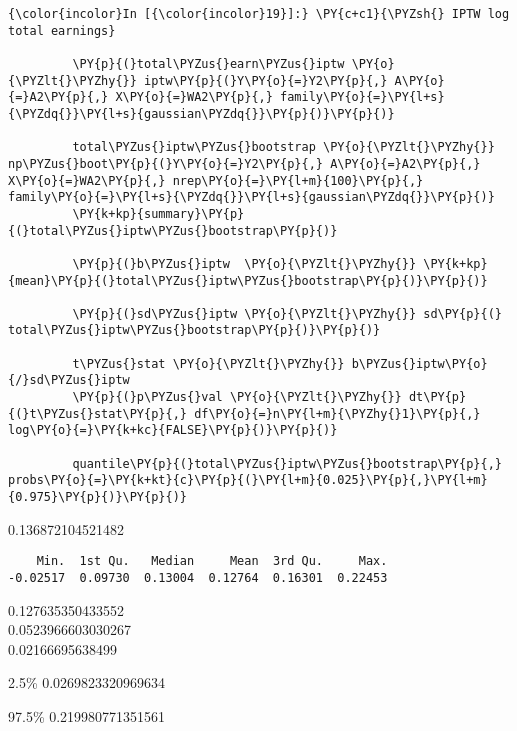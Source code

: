    \begin{Verbatim}[commandchars=\\\{\}]
{\color{incolor}In [{\color{incolor}19}]:} \PY{c+c1}{\PYZsh{} IPTW log total earnings}
         
         \PY{p}{(}total\PYZus{}earn\PYZus{}iptw \PY{o}{\PYZlt{}\PYZhy{}} iptw\PY{p}{(}Y\PY{o}{=}Y2\PY{p}{,} A\PY{o}{=}A2\PY{p}{,} X\PY{o}{=}WA2\PY{p}{,} family\PY{o}{=}\PY{l+s}{\PYZdq{}}\PY{l+s}{gaussian\PYZdq{}}\PY{p}{)}\PY{p}{)}
         
         total\PYZus{}iptw\PYZus{}bootstrap \PY{o}{\PYZlt{}\PYZhy{}} np\PYZus{}boot\PY{p}{(}Y\PY{o}{=}Y2\PY{p}{,} A\PY{o}{=}A2\PY{p}{,} X\PY{o}{=}WA2\PY{p}{,} nrep\PY{o}{=}\PY{l+m}{100}\PY{p}{,} family\PY{o}{=}\PY{l+s}{\PYZdq{}}\PY{l+s}{gaussian\PYZdq{}}\PY{p}{)} 
         \PY{k+kp}{summary}\PY{p}{(}total\PYZus{}iptw\PYZus{}bootstrap\PY{p}{)}
         
         \PY{p}{(}b\PYZus{}iptw  \PY{o}{\PYZlt{}\PYZhy{}} \PY{k+kp}{mean}\PY{p}{(}total\PYZus{}iptw\PYZus{}bootstrap\PY{p}{)}\PY{p}{)}
         
         \PY{p}{(}sd\PYZus{}iptw \PY{o}{\PYZlt{}\PYZhy{}} sd\PY{p}{(}  total\PYZus{}iptw\PYZus{}bootstrap\PY{p}{)}\PY{p}{)}
         
         t\PYZus{}stat \PY{o}{\PYZlt{}\PYZhy{}} b\PYZus{}iptw\PY{o}{/}sd\PYZus{}iptw
         \PY{p}{(}p\PYZus{}val \PY{o}{\PYZlt{}\PYZhy{}} dt\PY{p}{(}t\PYZus{}stat\PY{p}{,} df\PY{o}{=}n\PY{l+m}{\PYZhy{}1}\PY{p}{,} log\PY{o}{=}\PY{k+kc}{FALSE}\PY{p}{)}\PY{p}{)}
         
         quantile\PY{p}{(}total\PYZus{}iptw\PYZus{}bootstrap\PY{p}{,} probs\PY{o}{=}\PY{k+kt}{c}\PY{p}{(}\PY{l+m}{0.025}\PY{p}{,}\PY{l+m}{0.975}\PY{p}{)}\PY{p}{)}
\end{Verbatim}


    0.136872104521482\\

    
    
    \begin{verbatim}
    Min.  1st Qu.   Median     Mean  3rd Qu.     Max. 
-0.02517  0.09730  0.13004  0.12764  0.16301  0.22453 
    \end{verbatim}

    
    0.127635350433552\\

    
    0.0523966603030267\\

    
    0.02166695638499\\

    
    \begin{description*}
\item[2.5\%] 0.0269823320969634\\
\item[97.5\%] 0.219980771351561
\end{description*}


